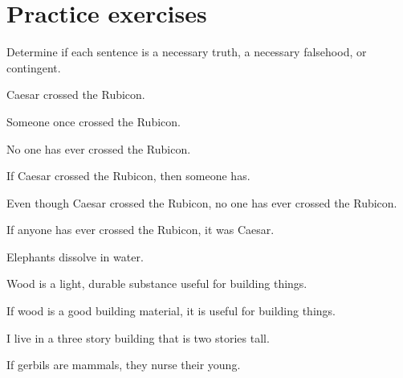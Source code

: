 
\section{Practice exercises}
\setcounter{ProbPart}{0}

\problempart
\label{pr.EnglishTautology2}
Determine if each sentence is a necessary truth, a necessary falsehood, or contingent.
\begin{earg}
\item Caesar crossed the Rubicon.
\item Someone once crossed the Rubicon.
\item No one has ever crossed the Rubicon.
\item If Caesar crossed the Rubicon, then someone has.
\item Even though Caesar crossed the Rubicon, no one has ever crossed the Rubicon.
\item If anyone has ever crossed the Rubicon, it was Caesar.

\item Elephants dissolve in water.
\item Wood is a light, durable substance useful for building things.
\item If wood is a good building material, it is useful for building things.
\item I live in a three story building that is two stories tall.
\item If gerbils are mammals, they nurse their young.
\end{earg}

